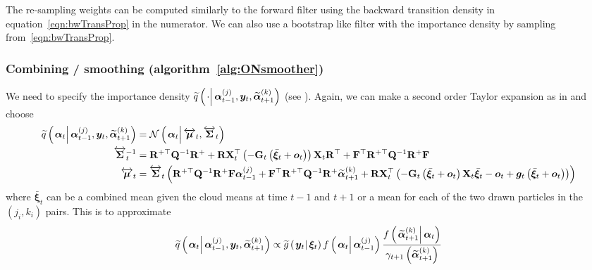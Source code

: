 \documentclass[9pt, notitlepage]{article}
\renewcommand{\vec}[1]{\bm{#1}}
\newcommand{\vecb}[1]{\bar{\vec{#1}}}
\newcommand{\vecLRarrow}[1]{\overleftrightarrow{\vec{#1}}}
\newcommand{\mat}[1]{\mathbf{#1}}
\newcommand{\matLRarrow}[1]{\overleftrightarrow{\mat{#1}}}
\newcommand{\Lparen}[1]{\left( #1\right)}
\newcommand{\Cond}[2]{\left. #1 \vphantom{#2} \right\vert  #2}
\newcommand{\optor}[2]{#1\Lparen{#2}}
\newcommand{\optorC}[3]{\optor{#1}{\Cond{#2}{#3}}}
\newcommand{\normalC}[3]{\optorC{\mathcal{N}}{#1}{#2,#3}}
\newcommand{\IDAproxC}[2]{\optorC{\widetilde{q}}{#1}{#2}}
\newcommand{\partic}[3]{#1_{#2}^{\Lparen{#3}}}
\newcommand{\particB}[3]{\widetilde{#1}_{#2}^{\Lparen{#3}}}
\begin{document}
The re-sampling weights can be computed similarly to the forward filter using the backward transition density in equation~\eqref{eqn:bwTransProp} in the numerator. We can also use a bootstrap like filter with the importance density by sampling from~\eqref{eqn:bwTransProp}.

\subsubsection*{Combining / smoothing (algorithm~\ref{alg:ONsmoother})}
We need to specify the importance density $\IDAproxC{\cdot}{\partic{\vec{\alpha}}{t-1}{j},\vec{y}_t, \particB{\vec{\alpha}}{t+1}{k}}$ (see \citet[page 453] {fearnhead10}). Again, we can make a second order Taylor expansion as in \cite{fearnhead10} and choose%
%
{\scriptsize%
\begin{equation}\begin{split}\label{eqn:approx_smooth}
	\IDAproxC{\vec{\alpha}_t}{\partic{\vec{\alpha}}{t-1}{j},\vec{y}_t, \particB{\vec{\alpha}}{t+1}{k}}  &=   %
		\normalC{\vec{\alpha}_t}{\vecLRarrow{\mu}_t}{\matLRarrow{\Sigma}_t} \\	
%
	\matLRarrow{\Sigma}_t^{-1} &=
		\mat{R}^{+\top}\mat{Q}^{-1}\mat{R}^+ +
		\mat{R}\mat{X}_t^\top\Lparen{-\mat{G}_t\Lparen{\vecb{\xi}_{t} + \vec{o}_t}}
		\mat{X}_t\mat{R}^\top + 
		\mat{F}^\top\mat{R}^{+\top}\mat{Q}^{-1}
		\mat{R}^{+}\mat{F}  \\
%
	\vecLRarrow{\mu}_t
	 &=  \matLRarrow{\Sigma}_t \Lparen{
		\mat{R}^{+\top}\mat{Q}^{-1}\mat{R}^+
		\mat{F}\partic{\vec{\alpha}}{t-1}{j} +
		\mat{F}^\top\mat{R}^{+\top}\mat{Q}^{-1}
		\mat{R}^+\particB{\vec{\alpha}}{t + 1}{k} +
		\mat{R}\mat{X}_t^\top
		\Lparen{
			-\mat{G}_t\Lparen{\vecb{\xi}_{t} + \vec{o}_t}
			\mat{X}_t\vecb{\xi}_{t} - \vec{o}_t +
			\vec{g}_t\Lparen{\vecb{\xi}_{t} + \vec{o}_t}
		}}
\end{split}\end{equation}%
}%
%
where $\vecb{\xi}_t$ can be a combined mean given the cloud means at time $t - 1$ and $t + 1$ or a mean for each of the  two drawn particles in the $(j_i,k_i)$ pairs. This is to approximate%
%
%
\begin{equation}\begin{split}
	\IDAproxC{\vec{\alpha}_t}{\partic{\vec{\alpha}}{t-1}{j},\vec{y}_t, \particB{\vec{\alpha}}{t+1}{k}} \propto %
%
	\optorC{\widetilde{g}}{\vec{y}_t}{\vec{\xi}_t}
		\optorC{f}{\vec{\alpha}_t}{\partic{\vec{\alpha}}{t-1}{j}}
		\frac{
			\optorC{f}{\particB{\vec{\alpha}}{t+1}{k}}{\vec{\alpha}_t}
		}{
			\gamma_{t + 1}\Lparen{\particB{\vec{\alpha}}{t+1}{k}}
		}
\end{split}\end{equation}
\end{document}
